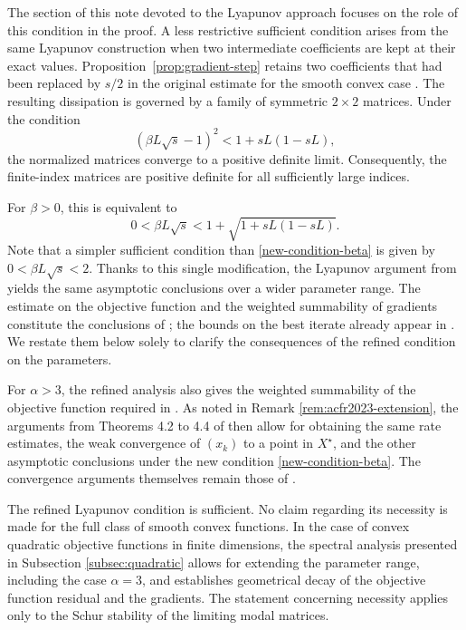 \documentclass[11pt]{article}
\theoremstyle{plain}
\theoremstyle{definition}
\begin{document}
The section of this note devoted to the Lyapunov approach focuses on the role of this condition in the proof. A less restrictive sufficient condition arises from the same Lyapunov construction when two intermediate coefficients are kept at their exact values. Proposition~\ref{prop:gradient-step} retains two coefficients that had been replaced by $s/2$ in the original estimate for the smooth convex case \cite[Appendix~A.1, Lemma~1]{AFCR2022}. 
The resulting dissipation is governed by a family of symmetric $2\times2$ matrices. Under the condition
$$
(\beta L\sqrt{s}-1)^2<1+sL(1-sL),
$$
the normalized matrices converge to a positive definite limit. Consequently, the finite-index matrices are positive definite for all sufficiently large indices.


For $\beta>0$, this is equivalent to
\begin{equation}\label{new-condition-beta}
0<\beta L\sqrt{s}<1+\sqrt{1+sL(1-sL)}.
\end{equation}
Note that a simpler sufficient condition than \eqref{new-condition-beta} is given by $0<\beta L\sqrt{s}<2$.
Thanks to this single modification, the Lyapunov argument from \cite{AFCR2022} yields the same asymptotic conclusions over a wider parameter range. The estimate on the objective function and the weighted summability of gradients constitute the conclusions of \cite[Theorem~6]{AFCR2022}; the bounds on the best iterate already appear in \cite[Remark~4]{AFCR2022}. We restate them below solely to clarify the consequences of the refined condition on the parameters.

For $\alpha > 3$, the refined analysis also gives the weighted summability of the objective function required in \cite{ACFR2023}. As noted in Remark \ref{rem:acfr2023-extension}, the arguments from Theorems 4.2 to 4.4 of \cite{ACFR2023} then allow for obtaining the same rate estimates, the weak convergence of $(x_k)$ to a point in $X^\star$, and the other asymptotic conclusions under the new condition \eqref{new-condition-beta}. The convergence arguments themselves remain those of \cite{ACFR2023}.

The refined Lyapunov condition is sufficient. No claim regarding its necessity is made for the full class of smooth convex functions. In the case of convex quadratic objective functions in finite dimensions, the spectral analysis presented in Subsection \ref{subsec:quadratic} allows for extending the parameter range, including the case $\alpha=3$, and establishes geometrical decay of the objective function residual and the gradients. The statement concerning necessity applies only to the Schur stability of the limiting modal matrices.
\end{document}

